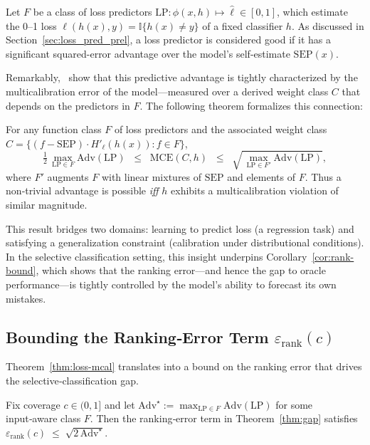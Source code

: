 Let \(F\) be a class of loss predictors \(\mathrm{LP} \colon \phi(x,h) \mapsto \hat{\ell} \in [0,1]\), which estimate the 0--1 loss \(\ell(h(x),y) = \mathbb{I}\{h(x) \ne y\}\) of a fixed classifier \(h\). As discussed in Section~\ref{sec:loss_pred_prel}, a loss predictor is considered good if it has a significant squared-error advantage over the model’s self-estimate \(\mathrm{SEP}(x)\).

Remarkably,~\citet{gollakota2025loss} show that this predictive advantage is tightly characterized by the multicalibration error of the model—measured over a derived weight class \(C\) that depends on the predictors in \(F\). The following theorem formalizes this connection:

\begin{theorem}
\label{thm:loss-mcal}
For any function class \(F\) of loss predictors and the associated
weight class \(C=\{(f-\mathrm{SEP})\cdot H'_{\ell}(h(x)) : f\in F\}\),
\begin{equation}
\tfrac12\,
\max_{\mathrm{LP}\in F}\mathrm{Adv}(\mathrm{LP})
\;\;\le\;\;
\mathrm{MCE}(C,h)
\;\;\le\;\;
\sqrt{\,
\max_{\mathrm{LP}\in F'}\mathrm{Adv}(\mathrm{LP})
},
\end{equation}
where \(F'\) augments \(F\) with linear mixtures of \(\mathrm{SEP}\) and
elements of \(F\).  Thus a non‑trivial advantage is possible
\emph{iff} \(h\) exhibits a multicalibration violation of similar
magnitude.
\end{theorem}

This result bridges two domains: learning to predict loss (a regression task) and satisfying a generalization constraint (calibration under distributional conditions). In the selective classification setting, this insight underpins Corollary~\ref{cor:rank-bound}, which shows that the ranking error—and hence the gap to oracle performance—is tightly controlled by the model’s ability to forecast its own mistakes.



\subsection{Bounding the Ranking‑Error Term \(\varepsilon_{\text{rank}}(c)\)}

Theorem~\ref{thm:loss-mcal} translates into a bound on the ranking error
that drives the selective‑classification gap.

\begin{corollary}
\label{cor:rank-bound}
Fix coverage \(c\in(0,1]\) and let
\(\mathrm{Adv}^{\star}:=\max_{\mathrm{LP}\in F}\mathrm{Adv}(\mathrm{LP})\)
for some input‑aware class \(F\).
Then the ranking‑error term in
Theorem~\ref{thm:gap}
satisfies
\(
\varepsilon_{\text{rank}}(c)
\;\le\;
\sqrt{2\,\mathrm{Adv}^{\star}}.
\)
\end{corollary}

